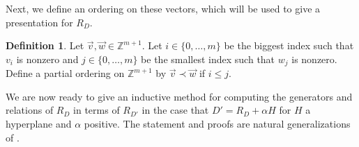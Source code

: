 \documentclass{amsart}
\theoremstyle{plain}
\theoremstyle{definition}
\newtheorem{defn}[thm]{Definition}
\theoremstyle{remark}
\numberwithin{equation}{subsection}
\newcommand\bz{{\mathbb Z}}
\begin{document}
Next, we define an ordering on these vectors, which will be used to
give a presentation for $R_D$.

\begin{defn}
\label{defn:vec-order}
Let $\vec{v}, \vec{w} \in \bz^{m+1}$. Let $i \in \{0,\ldots, m\}$
be the biggest index such that $v_i$ is nonzero
and $j \in \{0,\ldots, m\}$ be the smallest index such that $w_j$ is
nonzero. Define a partial ordering
on $\bz^{m+1}$ by $\vec{v} \prec \vec{w}$ if $i \leq j$.
\end{defn}

We are now ready to give an inductive method for computing
the generators and relations of $R_D$ in terms of $R_{D'}$ 
in the case that $D' = R_D + \alpha H$ for $H$ a hyperplane and
$\alpha$ positive.
The statement and proofs are natural generalizations of
\cite[Theorem 6]{dorney:canonical}.
\end{document}
